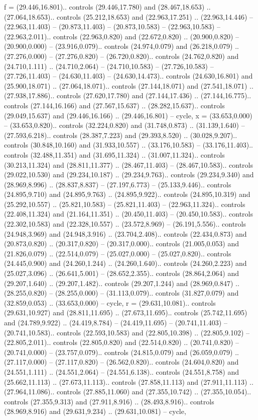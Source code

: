 {f} = {(29.446,16.801).. controls (29.446,17.780) and (28.467,18.653) .. (27.064,18.653).. controls (25.212,18.653) and (22.963,17.251) .. (22.963,14.446) -- (22.963,11.403) -- (20.873,11.403) -- (20.873,10.583) -- (22.963,10.583) -- (22.963,2.011).. controls (22.963,0.820) and (22.672,0.820) .. (20.900,0.820) -- (20.900,0.000) -- (23.916,0.079).. controls (24.974,0.079) and (26.218,0.079) .. (27.276,0.000) -- (27.276,0.820) -- (26.720,0.820).. controls (24.762,0.820) and (24.710,1.111) .. (24.710,2.064) -- (24.710,10.583) -- (27.726,10.583) -- (27.726,11.403) -- (24.630,11.403) -- (24.630,14.473).. controls (24.630,16.801) and (25.900,18.071) .. (27.064,18.071).. controls (27.144,18.071) and (27.541,18.071) .. (27.938,17.886).. controls (27.620,17.780) and (27.144,17.436) .. (27.144,16.775).. controls (27.144,16.166) and (27.567,15.637) .. (28.282,15.637).. controls (29.049,15.637) and (29.446,16.166) .. (29.446,16.801) -- cycle},
{x} = {(33.653,0.000) -- (33.653,0.820).. controls (32.224,0.820) and (31.748,0.873) .. (31.139,1.640) -- (27.593,6.218).. controls (28.387,7.223) and (29.393,8.520) .. (30.028,9.207).. controls (30.848,10.160) and (31.933,10.557) .. (33.176,10.583) -- (33.176,11.403).. controls (32.488,11.351) and (31.695,11.324) .. (31.007,11.324).. controls (30.213,11.324) and (28.811,11.377) .. (28.467,11.403) -- (28.467,10.583).. controls (29.022,10.530) and (29.234,10.187) .. (29.234,9.763).. controls (29.234,9.340) and (28.969,8.996) .. (28.837,8.837) -- (27.197,6.773) -- (25.133,9.446).. controls (24.895,9.710) and (24.895,9.763) .. (24.895,9.922).. controls (24.895,10.319) and (25.292,10.557) .. (25.821,10.583) -- (25.821,11.403) -- (22.963,11.324).. controls (22.408,11.324) and (21.164,11.351) .. (20.450,11.403) -- (20.450,10.583).. controls (22.302,10.583) and (22.328,10.557) .. (23.572,8.969) -- (26.191,5.556).. controls (24.948,3.969) and (24.948,3.916) .. (23.704,2.408).. controls (22.434,0.873) and (20.873,0.820) .. (20.317,0.820) -- (20.317,0.000).. controls (21.005,0.053) and (21.826,0.079) .. (22.514,0.079) -- (25.027,0.000) -- (25.027,0.820).. controls (24.445,0.900) and (24.260,1.244) .. (24.260,1.640).. controls (24.260,2.223) and (25.027,3.096) .. (26.641,5.001) -- (28.652,2.355).. controls (28.864,2.064) and (29.207,1.640) .. (29.207,1.482).. controls (29.207,1.244) and (28.969,0.847) .. (28.255,0.820) -- (28.255,0.000) -- (31.113,0.079).. controls (31.827,0.079) and (32.859,0.053) .. (33.653,0.000) -- cycle},
{r} = {(29.631,10.081).. controls (29.631,10.927) and (28.811,11.695) .. (27.673,11.695).. controls (25.742,11.695) and (24.789,9.922) .. (24.419,8.784) -- (24.419,11.695) -- (20.741,11.403) -- (20.741,10.583).. controls (22.593,10.583) and (22.805,10.398) .. (22.805,9.102) -- (22.805,2.011).. controls (22.805,0.820) and (22.514,0.820) .. (20.741,0.820) -- (20.741,0.000) -- (23.757,0.079).. controls (24.815,0.079) and (26.059,0.079) .. (27.117,0.000) -- (27.117,0.820) -- (26.562,0.820).. controls (24.604,0.820) and (24.551,1.111) .. (24.551,2.064) -- (24.551,6.138).. controls (24.551,8.758) and (25.662,11.113) .. (27.673,11.113).. controls (27.858,11.113) and (27.911,11.113) .. (27.964,11.086).. controls (27.885,11.060) and (27.355,10.742) .. (27.355,10.054).. controls (27.355,9.313) and (27.911,8.916) .. (28.493,8.916).. controls (28.969,8.916) and (29.631,9.234) .. (29.631,10.081) -- cycle},

